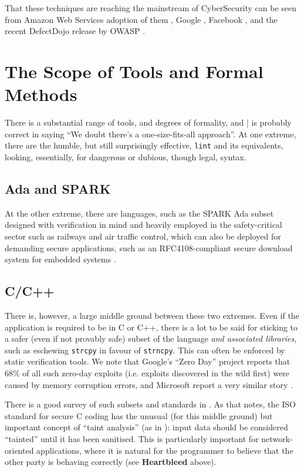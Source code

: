 \documentclass{eptcs}
\begin{document}
\par
That these techniques are reaching the mainstream of CyberSecurity can be seen from Amazon Web Services adoption of them  \cite{Vogels2019a}, Google \cite{Sadowskietal2018a}, Facebook \cite{Distefanoetal2019a}, and the recent DefectDojo release by OWASP \cite{OWASP2019b}.
\section{The Scope of Tools and Formal Methods}
There is a substantial range of tools, and degrees of formality, and \bar{} is probably correct in saying ``We doubt there’s a one-size-fits-all approach''. At one extreme, there are the humble, but still surprisingly effective, \verb+lint+ and its equivalents, looking, essentially, for dangerous or dubious, though legal, syntax. 
\subsection{Ada and SPARK}
At the other extreme, there are languages, such as the SPARK Ada subset \cite{ChapmanMoy2018a} designed with verification in mind and heavily employed in the safety-critical sector such as railways and air traffic control, which can also be deployed for demanding secure applications, such as an RFC4108-compliant \cite{Housley2005} secure download system for embedded systems \cite{Chapman2018b}.
\subsection{C/C++}
There is, however, a large middle ground between these two extremes.  Even if the application is required to be in C or C++, there is a lot to be said for sticking to a safer (even if not provably safe) subset of the language \emph{and associated libraries}, such as eschewing \verb+strcpy+ in favour of \verb+strncpy+. This can often be enforced by static verification tools.
We note that Google's ``Zero Day'' project reports \cite{Google2019g} that 68\% of all such zero-day exploits (i.e. exploits discovered in the wild first) were caused by memory corruption errors, and Microsoft report a very similar story \cite{Thomas2019a}.

There is a good survey of such subsets and standards in \cite[Appendix F]{CPNI2019a}.   As that notes, the ISO standard for secure C coding \cite{ISO2013d} has the unusual (for this middle ground) but important concept of ``taint analysis'' (as in \cite{LivshitsLam2005}): input data should be considered ``tainted'' until it has been sanitised.  This is particularly important for network-oriented applications, where it is natural for the programmer to believe that the other party is behaving correctly (see {\bf Heartbleed} above).
\end{document}
